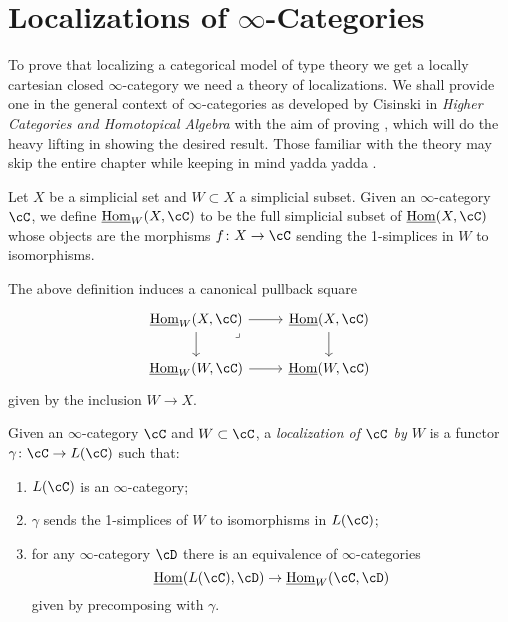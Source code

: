 \documentclass[a4paper,fontsize=12pt]{scrartcl}
\begin{document}
\section{Localizations of \texorpdfstring{$\infty$}{∞}-Categories}

To prove that localizing a categorical model of type theory we get a locally
cartesian closed $\infty$-category we need a theory of localizations. We shall
provide one in the general context of $\infty$-categories as developed by
Cisinski in \emph{Higher Categories and Homotopical Algebra} with the aim of
proving \cite[Thm.\ 7.6.16]{Cis19}, which will do the heavy lifting in showing
the desired result. Those familiar with the theory may skip the entire chapter
while keeping in mind yadda yadda .

\begin{defn}
  Let $X$ be a simplicial set and $W\subset X$ a simplicial subset. Given an
  $\infty$-category $\cC$, we define $\Home_W(X,\cC)$ to be the full simplicial
  subset of $\Home(X,\cC)$ whose objects are the morphisms $f\colon
  X\rightarrow\cC$ sending the 1-simplices in $W$ to isomorphisms.
\end{defn}

\begin{rmk}
  The above definition induces a canonical pullback square
  \[\begin{tikzcd}
    {\Home_W(X,\cC)} & {\Home(X,\cC)} \\
    {\Home_W(W,\cC)} & {\Home(W,\cC)}
    \arrow[from=1-1, to=2-1]
    \arrow[from=2-1, to=2-2]
    \arrow[from=1-2, to=2-2]
    \arrow[from=1-1, to=1-2]
    \arrow["\lrcorner"{anchor=center, pos=0.125}, draw=none, from=1-1, to=2-2]
  \end{tikzcd}\]
  given by the inclusion $W\rightarrow X$.
\end{rmk}

\begin{defn}
  Given an $\infty$-category $\cC$ and $W\subset\cC$, a \emph{localization of
  $\cC$ by $W$} is a functor $\gamma\colon\cC\rightarrow L(\cC)$ such that:
  \begin{enumerate}
    \item $L(\cC)$ is an $\infty$-category;
    \item $\gamma$ sends the 1-simplices of $W$ to isomorphisms in $L(\cC)$;
    \item for any $\infty$-category $\cD$ there is an equivalence of
      $\infty$-categories
      \[\Home(L(\cC),\cD)\rightarrow\Home_W(\cC,\cD)\]
      given by precomposing with $\gamma$.
  \end{enumerate}
\end{defn}
\end{document}
